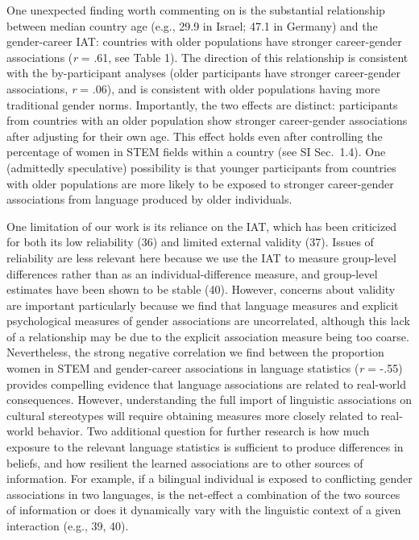 \documentclass[9pt,twocolumn]{pnas-new}
\begin{document}
One unexpected finding worth commenting on is the substantial relationship between median country age (e.g., 29.9 in Israel; 47.1 in Germany) and the gender-career IAT: countries with older populations have stronger career-gender associations (\emph{r} = .61, see Table 1). The direction of this relationship is consistent with the by-participant analyses (older participants have stronger career-gender associations, \emph{r} = .06), and is consistent with older populations having more traditional gender norms. Importantly, the two effects are distinct: participants from countries with an older population show stronger career-gender associations after adjusting for their own age. This effect holds even after controlling the percentage of women in STEM fields within a country (see SI Sec.\ 1.4). One (admittedly speculative) possibility is that younger participants from countries with older populations are more likely to be exposed to stronger career-gender associations from language produced by older individuals.  



One limitation of our work is its reliance on the IAT, which has been criticized for both its low reliability (36) and limited external validity (37). Issues of reliability are less relevant here because we use the IAT to measure group-level differences rather than as an individual-difference measure, and group-level estimates have been shown to be stable (40). However, concerns about validity are important particularly because we find that language measures and explicit psychological measures of gender associations are uncorrelated, although this lack of a relationship may be due to the explicit association measure being too coarse. Nevertheless, the strong negative correlation we find between the proportion women in STEM and gender-career associations in language statistics (\emph{r} = -.55) provides compelling evidence that language associations are related to real-world consequences. However, understanding the full import of linguistic associations on cultural stereotypes will require obtaining measures more closely related to real-world behavior. Two additional question for further research is how much exposure to the relevant language statistics is sufficient to produce differences in beliefs, and how resilient the learned associations are to other sources of information. For example, if a bilingual individual is exposed to conflicting gender associations in two languages, is the net-effect a combination of the two sources of information or does it dynamically vary with the linguistic context of a given interaction (e.g., 39, 40).
\end{document}
